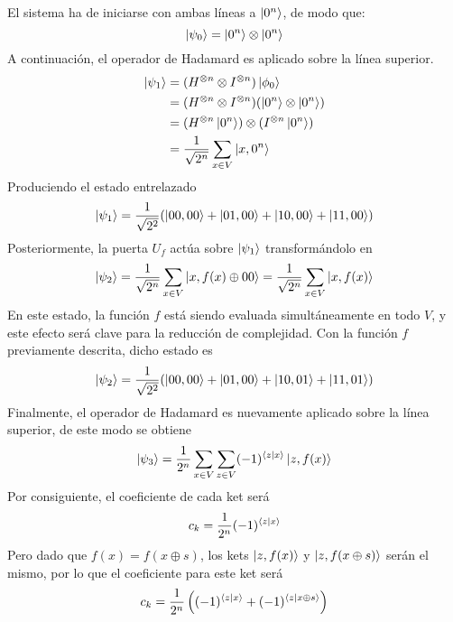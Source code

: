El sistema ha de iniciarse con ambas líneas a $\ket{0^n}$, de modo que:
%
$$ \ket{\psi_0} = \ket{0^n} \otimes \ket{0^n} $$
%
A continuación, el operador de Hadamard es aplicado sobre la línea superior.
%
\begin{equation}
\begin{split}
\ket{\psi_1} & = (H^{\otimes n} \otimes I^{\otimes n}) \ket{\phi_0} \\
	& = (H^{\otimes n} \otimes I^{\otimes n}) (\ket{0^n} \otimes \ket{0^n}) \\
	& = (H^{\otimes n} \ket{0^n}) \otimes (I^{\otimes n} \ket{0^n}) \\
	& = \frac{1}{\sqrt{2^n}} \sum_{x \in V} \ket{x, 0^n}
\end{split}
\end{equation}
%
Produciendo el estado entrelazado
%
\begin{equation}
\ket{\psi_1} = \frac{1}{\sqrt{2^2}} (\ket{00,00} + \ket{01,00} + \ket{10,00} + 
\ket{11,00})
\end{equation}
%
Posteriormente, la puerta $U_f$ actúa sobre $\ket{\psi_1}$ transformándolo en
%
\begin{equation}
\ket{\psi_2} = \frac{1}{\sqrt{2^n}} \sum_{x \in V} \ket{x, f(x) \oplus 00} = 
\frac{1}{\sqrt{2^n}} \sum_{x \in V} \ket{x, f(x)}
\end{equation}
%
En este estado, la función $f$ está siendo evaluada simultáneamente en todo $V$, 
y este efecto será clave para la reducción de complejidad. Con la función $f$ 
previamente descrita, dicho estado es
%
\begin{equation}
\ket{\psi_2} = \frac{1}{\sqrt{2^2}} (\ket{00,00} + \ket{01,00} + \ket{10,01} + 
\ket{11,01})
\end{equation}
%
Finalmente, el operador de Hadamard es nuevamente aplicado sobre la línea 
superior, de este modo se obtiene
\begin{equation}
\ket{\psi_3} = \frac{1}{2^n} \sum_{x \in V} \sum_{z \in V}
	(-1)^{\braket{z|x}} \ket{z, f(x)}
\end{equation}
%
Por consiguiente, el coeficiente de cada ket será
%
\begin{equation}
c_k = \frac{1}{2^n} (-1)^{\braket{z|x}}
\end{equation}
%
Pero dado que $f(x) = f(x \oplus s)$, los kets $\ket{z, f(x)}$ y $\ket{z, f(x 
\oplus s)}$ serán el mismo, por lo que el coeficiente para este ket será
%
\begin{equation}
c_k = \frac{1}{2^n} \left((-1)^{\braket{z|x}} + (-1)^{\braket{z|x \oplus 
s}}\right)
\end{equation}
